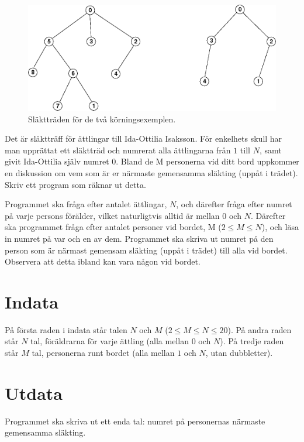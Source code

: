 \begin{figure}[h!]
  \centering
  \includegraphics[scale=0.3]{slakttraffen}
  \caption{Släktträden för de två körningsexemplen.}
\end{figure}

Det är släktträff för ättlingar till Ida-Ottilia Isaksson.
För enkelhets skull har man upprättat ett släktträd och numrerat alla ättlingarna från $1$ till $N$, samt givit Ida-Ottilia själv numret $0$.
Bland de M personerna vid ditt bord uppkommer en diskussion om vem som är er närmaste gemensamma släkting (uppåt i trädet).
Skriv ett program som räknar ut detta.

Programmet ska fråga efter antalet ättlingar, $N$, och därefter fråga efter numret på varje persons förälder, vilket naturligtvis alltid är mellan $0$ och $N$.
Därefter ska programmet fråga efter antalet personer vid bordet, M ($2 \le M \le N$), och läsa in numret på var och en av dem.
Programmet ska skriva ut numret på den person som är närmast gemensam släkting (uppåt i trädet) till alla vid bordet.
Observera att detta ibland kan vara någon vid bordet.

\section*{Indata}
På första raden i indata står talen $N$ och $M$ ($2 \le M \le N \le 20$).
På andra raden står $N$ tal, föräldrarna för varje ättling (alla mellan $0$ och $N$).
På tredje raden står $M$ tal, personerna runt bordet (alla mellan $1$ och $N$, utan dubbletter).

\section*{Utdata}
Programmet ska skriva ut ett enda tal: numret på personernas närmaste gemensamma släkting.
